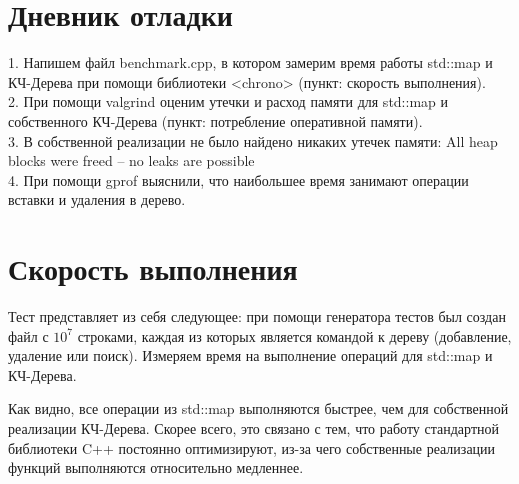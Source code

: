 \section{Дневник отладки}
1. Напишем файл benchmark.cpp, в котором замерим время работы std::map и КЧ-Дерева при помощи библиотеки <chrono> (пункт: скорость выполнения).
\\2. При помощи valgrind оценим утечки и расход памяти для std::map и собственного КЧ-Дерева (пункт: потребление оперативной памяти).
\\3. В собственной реализации не было найдено никаких утечек памяти: All heap blocks were freed -- no leaks are possible
\\4. При помощи gprof выяснили, что наибольшее время занимают операции вставки и удаления в дерево.

\pagebreak
\section{Скорость выполнения}
Тест представляет из себя следующее: при помощи генератора тестов был создан файл с $10^7$ строками, каждая из которых
является командой к дереву (добавление, удаление или поиск). Измеряем время на выполнение операций для std::map и КЧ-Дерева. 
Как видно, все операции из std::map выполняются быстрее, чем для собственной реализации КЧ-Дерева. Скорее всего, это связано с тем, что работу 
стандартной библиотеки C++ постоянно оптимизируют, из-за чего собственные реализации функций выполняются относительно медленнее.
\pagebreak

